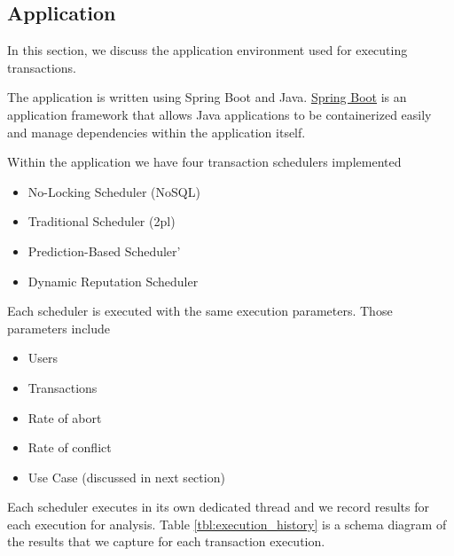 \subsection{Application}
\label{sec:er_application}

In this section, we discuss the application environment used for executing transactions.

The application is written using Spring Boot and Java.
\href{https://spring.io/projects/spring-boot}{Spring Boot} is an application framework that allows Java applications to be containerized easily and manage dependencies within the application itself.

Within the application we have four transaction schedulers implemented

\begin{itemize}
  \item No-Locking Scheduler (NoSQL)
  \item Traditional Scheduler (\gls{2pl})
  \item Prediction-Based Scheduler'
  \item Dynamic Reputation Scheduler
\end{itemize}

Each scheduler is executed with the same execution parameters. Those parameters include

\begin{itemize}
    \item Users
    \item Transactions
    \item Rate of abort
    \item Rate of conflict
    \item Use Case (discussed in next section)
\end{itemize}

Each scheduler executes in its own dedicated thread and we record results for each execution for analysis. Table \ref{tbl:execution_history} is a schema diagram of the results that we capture for each transaction execution.

